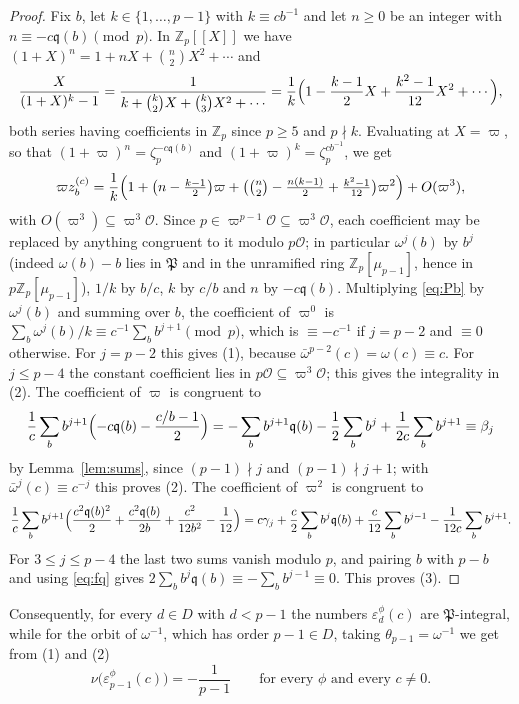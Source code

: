 \documentclass[11pt]{amsart}
\theoremstyle{definition}
\theoremstyle{remark}
\providecommand{\Z}{\mathbb Z}
\newcommand{\fq}{\mathfrak q}
\newcommand{\fP}{\mathfrak P}
\newcommand{\Ok}{\mathcal O}
\numberwithin{equation}{section}
\begin{document}
\begin{proof}
Fix $b$, let $k\in\{1,\dots,p-1\}$ with $k\equiv cb^{-1}$ and let $n\ge0$ be an integer with $n\equiv-c\fq(b)\pmod p$.
In $\Z_p[[X]]$ we have $(1+X)^n=1+nX+\binom n2X^2+\cdots$ and
\[
\frac{X}{(1+X)^k-1}=\frac1{k+\binom k2X+\binom k3X^2+\cdots}=\frac1k\Bigl(1-\frac{k-1}2X+\frac{k^2-1}{12}X^2+\cdots\Bigr),
\]
both series having coefficients in $\Z_p$ since $p\ge5$ and $p\nmid k$.
Evaluating at $X=\varpi$, so that $(1+\varpi)^n=\zeta_p^{-c\fq(b)}$ and $(1+\varpi)^k=\zeta_p^{cb^{-1}}$, we get
\begin{equation}\label{eq:Pb}
\varpi z_b^{(c)}=\frac1k\Bigl(1+\bigl(n-\tfrac{k-1}2\bigr)\varpi+\bigl(\tbinom n2-\tfrac{n(k-1)}2+\tfrac{k^2-1}{12}\bigr)\varpi^2\Bigr)+O(\varpi^3),
\end{equation}
with $O(\varpi^3)\subseteq\varpi^3\Ok$.
Since $p\in\varpi^{p-1}\Ok\subseteq\varpi^3\Ok$, each coefficient may be replaced by anything congruent to it modulo $p\Ok$; in particular $\omega^j(b)$ by $b^j$ (indeed $\omega(b)-b$ lies in $\fP$ and in the unramified ring $\Z_p[\mu_{p-1}]$, hence in $p\Z_p[\mu_{p-1}]$), $1/k$ by $b/c$, $k$ by $c/b$ and $n$ by $-c\fq(b)$.
Multiplying \eqref{eq:Pb} by $\omega^j(b)$ and summing over $b$, the coefficient of $\varpi^0$ is $\sum_b\omega^j(b)/k\equiv c^{-1}\sum_bb^{j+1}\pmod p$, which is $\equiv-c^{-1}$ if $j=p-2$ and $\equiv0$ otherwise.
For $j=p-2$ this gives (1), because $\bar\omega^{p-2}(c)=\omega(c)\equiv c$.
For $j\le p-4$ the constant coefficient lies in $p\Ok\subseteq\varpi^3\Ok$; this gives the integrality in (2).
The coefficient of $\varpi$ is congruent to
\[
\frac1c\sum_bb^{j+1}\Bigl(-c\fq(b)-\frac{c/b-1}2\Bigr)=-\sum_bb^{j+1}\fq(b)-\frac12\sum_bb^j+\frac1{2c}\sum_bb^{j+1}\equiv\beta_j
\]
by Lemma~\ref{lem:sums}, since $(p-1)\nmid j$ and $(p-1)\nmid j+1$; with $\bar\omega^j(c)\equiv c^{-j}$ this proves (2).
The coefficient of $\varpi^2$ is congruent to
\[
\frac1c\sum_bb^{j+1}\Bigl(\frac{c^2\fq(b)^2}2+\frac{c^2\fq(b)}{2b}+\frac{c^2}{12b^2}-\frac1{12}\Bigr)
=c\gamma_j+\frac c2\sum_bb^{j}\fq(b)+\frac c{12}\sum_bb^{j-1}-\frac1{12c}\sum_bb^{j+1}.
\]
For $3\le j\le p-4$ the last two sums vanish modulo $p$, and pairing $b$ with $p-b$ and using \eqref{eq:fq} gives $2\sum_bb^j\fq(b)\equiv-\sum_bb^{j-1}\equiv0$.
This proves (3).
\end{proof}

Consequently, for every $d\in D$ with $d<p-1$ the numbers $\varepsilon_d^\phi(c)$ are $\fP$-integral, while for the orbit of $\omega^{-1}$, which has order $p-1\in D$, taking $\theta_{p-1}=\omega^{-1}$ we get from (1) and (2)
\begin{equation}\label{eq:polar}
\nu\bigl(\varepsilon_{p-1}^\phi(c)\bigr)=-\frac1{p-1}\qquad\text{for every }\phi\text{ and every }c\ne0 .
\end{equation}
\end{document}
